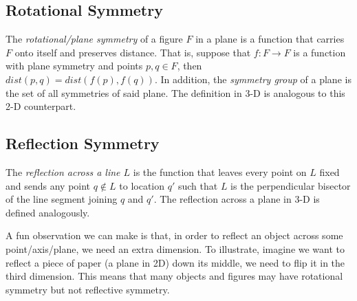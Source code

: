 \subsection{Rotational Symmetry}

The \textit{rotational/plane symmetry} of a figure \(F\) in a plane is a function that carries \(F\) onto itself and preserves distance. That is, suppose that \(f: F \to F\) is a function with plane symmetry and points \(p, q \in F\), then \(dist(p, q) = dist(f(p), f(q))\). In addition, the \textit{symmetry group} of a plane is the set of all symmetries of said plane. The definition in 3-D is analogous to this 2-D counterpart.

\subsection{Reflection Symmetry}

The \textit{reflection across a line \(L\)} is the function that leaves every point on \(L\) fixed and sends any point \(q \notin L\) to location \(q'\) such that \(L\) is the perpendicular bisector of the line segment joining \(q\) and \(q'\). The reflection across a plane in 3-D is defined analogously.

A fun observation we can make is that, in order to reflect an object across some point/axis/plane, we need an extra dimension. To illustrate, imagine we want to reflect a piece of paper (a plane in 2D) down its middle, we need to flip it in the third dimension. This means that many objects and figures may have rotational symmetry but not reflective symmetry.
